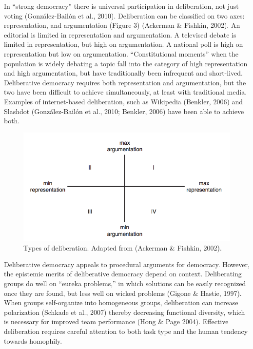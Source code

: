In “strong democracy” there is universal participation in deliberation, not just voting (Gonz\'alez-Bail\'on et al., 2010). Deliberation can be classified on two axes: representation, and argumentation (Figure 3) (Ackerman \& Fishkin, 2002). An editorial is limited in representation and argumentation. A televised debate is limited in representation, but high on argumentation. A national poll is high on representation but low on argumentation. “Constitutional moments” when the population is widely debating a topic fall into the category of high representation and high argumentation, but have traditionally been infrequent and short-lived. Deliberative democracy requires both representation and argumentation, but the two have been difficult to achieve simultaneously, at least with traditional media. Examples of internet-based deliberation, such as Wikipedia (Benkler, 2006) and Slashdot (Gonz\'alez-Bail\'on et al., 2010; Benkler, 2006) have been able to achieve both.

\begin{figure}
\includegraphics{images/fig-deliberation.png}
\caption{Types of deliberation. Adapted from (Ackerman \& Fishkin, 2002).\label{fig:deliberation}}
\end{figure}

Deliberative democracy appeals to procedural arguments for democracy. However, the epistemic merits of deliberative democracy depend on context. Deliberating groups do well on “eureka problems,” in which solutions can be easily recognized once they are found, but less well on wicked problems (Gigone \& Hastie, 1997). When groups self-organize into homogeneous groups, deliberation can increase polarization (Schkade et al., 2007) thereby decreasing functional diversity, which is necessary for improved team performance (Hong \& Page 2004). Effective deliberation requires careful attention to both task type and the human tendency towards homophily.

